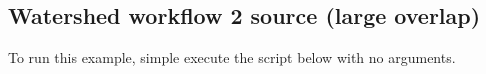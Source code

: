 \documentclass[a4paper]{article}
\begin{document}
\newpage
\subsection{Watershed workflow 2 source (large overlap)}
\label{app:watershed_workflow_2}
To run this example, simple execute the script below with no arguments.
\inputminted{python}{src/watershed/watershed_morph.py}





\newpage
\printbibliography
\end{document}
